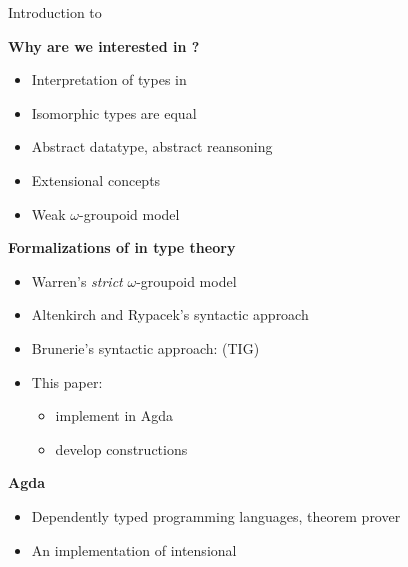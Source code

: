 \documentclass[12pt, mathserif,handout]{beamer}
\begin{document}
\begin{frame}[allowframebreaks,c]{Introduction to \wog}
\framebreak


\textbf{Why are we interested in \wog?}
\begin{itemize}
\item Interpretation of types in \hott
\item Isomorphic types are equal
\item Abstract datatype, abstract reansoning
\item Extensional concepts
\item Weak $\omega$-groupoid model
\end{itemize}

\framebreak

\textbf{Formalizations of \wog in type theory}


\begin{itemize}
\item Warren's \emph{strict} $\omega$-groupoid model
\item Altenkirch and Rypacek's syntactic approach
\item Brunerie's syntactic approach: \tig (TIG)

\item This paper:
\begin{itemize}
\item implement \tig in Agda
\item develop constructions
\end{itemize}
\end{itemize}

\textbf{Agda}
\begin{itemize}
\item Dependently typed programming languages, theorem prover
\item An implementation of intensional \mltt
\end{itemize}






\end{frame}
\end{document}

